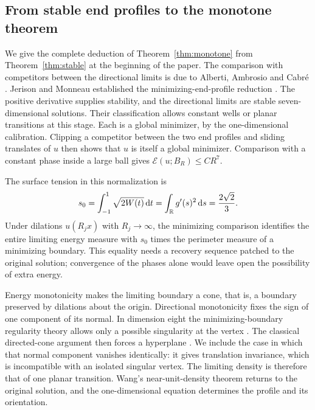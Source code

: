 \subsection{From stable end profiles to the monotone theorem}

We give the complete deduction of Theorem~\ref{thm:monotone} from
Theorem~\ref{thm:stable} at the beginning of the paper.
The comparison with competitors between the directional limits is due
to Alberti, Ambrosio and Cabr\'e
\cite[Theorem~4.4]{AlbertiAmbrosioCabre2001}.
Jerison and Monneau established the minimizing-end-profile reduction
\cite[Theorem~1.3]{JerisonMonneau2004}.
The positive derivative supplies stability, and the directional
limits are stable seven-dimensional solutions.  Their classification
allows constant wells or planar transitions at this stage.
Each is a global minimizer, by the one-dimensional calibration.
Clipping a competitor between the two end profiles and sliding
translates of $u$ then shows that $u$ is itself a global minimizer.
Comparison with a constant phase inside a large ball gives
$\mathcal E(u;B_R)\le CR^7$.

The surface tension in this normalization is
\begin{equation}\label{eq:intro-tension}
 s_0=\int_{-1}^1\sqrt{2W(t)}\,\mathrm d t
     =\int_\mathbb R g'(s)^2\,\mathrm d s
     =\frac{2\sqrt2}{3}.
\end{equation}
Under dilations $u(R_jx)$ with $R_j\to\infty$, the minimizing
comparison identifies the entire limiting energy measure with
$s_0$ times the perimeter measure of a minimizing boundary.
This equality needs a recovery sequence patched to the original
solution; convergence of the phases alone would leave open the
possibility of extra energy.

Energy monotonicity makes the limiting boundary a cone, that is,
a boundary preserved by dilations about the origin.
Directional monotonicity fixes the sign of one component of its
normal.  In dimension eight the minimizing-boundary regularity
theory allows only a possible singularity at the vertex
\cite{Federer1970}.
The classical directed-cone argument then forces a hyperplane
\cite{Schnuerer2003}.  We include the case in which that normal
component vanishes identically: it gives translation invariance,
which is incompatible with an isolated singular vertex.
The limiting density is therefore that of one planar transition.
Wang's near-unit-density theorem
\cite[Theorem~11.1]{Wang2017} returns to the original solution,
and the one-dimensional equation determines the profile and its
orientation.

